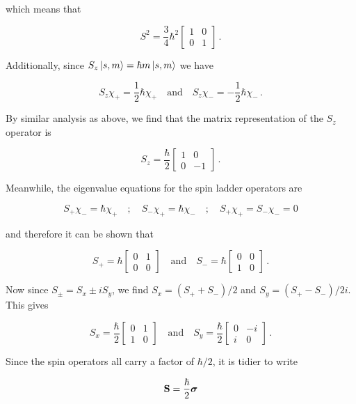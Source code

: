 \documentclass[12pt, titlepage]{article}
\newcommand{\Sx}{\begin{bmatrix} 0 & 1 \\ 1 & 0\end{bmatrix}}
\newcommand{\Sy}{\begin{bmatrix} 0 & -i \\ i & 0\end{bmatrix}}
\newcommand{\Sz}{\begin{bmatrix} 1 & 0 \\ 0 & -1\end{bmatrix}}
\begin{document}
which means that

\begin{equation}
	S^2 = \frac{3}{4}\hbar^2\begin{bmatrix} 1 & 0 \\ 0 & 1\end{bmatrix} \,.
\end{equation}

Additionally, since $S_z\ket{s, m} = \hbar m \ket{s, m}$ we have

\begin{equation}
S_z\chi_+ = \frac{1}{2}\hbar\chi_+ \quad\text{and}\quad S_z\chi_- = -\frac{1}{2}\hbar\chi_- \,.
\end{equation}

By similar analysis as above, we find that the matrix representation of the $S_z$ operator is

\begin{equation}
	S_z = \frac{\hbar}{2}\Sz \,.
\end{equation}

Meanwhile, the eigenvalue equations for the spin ladder operators are

\begin{equation*}
	S_+\chi_- = \hbar\chi_+ \quad;\quad S_-\chi_+ = \hbar\chi_- \quad;\quad S_+\chi_+ = S_-\chi_- = 0
\end{equation*}

and therefore it can be shown that

\begin{equation}
	S_+ = \hbar\begin{bmatrix} 0 & 1 \\ 0 & 0\end{bmatrix} \quad\text{and}\quad S_- = \hbar\begin{bmatrix} 0 & 0 \\ 1 & 0\end{bmatrix} \,.
\end{equation}

Now since $S_\pm = S_x \pm iS_y$, we find $S_x = (S_+ + S_-)/2$ and $S_y = (S_+ - S_-)/2i$. This gives

\begin{equation}
	S_x = \frac{\hbar}{2}\Sx \quad\text{and}\quad S_y = \frac{\hbar}{2}\Sy \,.
\end{equation}

Since the spin operators all carry a factor of $\hbar/2$, it is tidier to write

\begin{equation}
	\vb{S} = \frac{\hbar}{2}\vb*{\sigma}
\end{equation}
\end{document}

